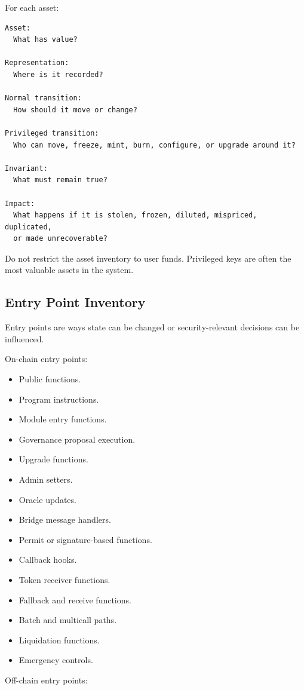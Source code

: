For each asset:

\begin{lstlisting}
Asset:
  What has value?

Representation:
  Where is it recorded?

Normal transition:
  How should it move or change?

Privileged transition:
  Who can move, freeze, mint, burn, configure, or upgrade around it?

Invariant:
  What must remain true?

Impact:
  What happens if it is stolen, frozen, diluted, mispriced, duplicated,
  or made unrecoverable?
\end{lstlisting}

Do not restrict the asset inventory to user funds. Privileged keys are
often the most valuable assets in the system.

\subsection{Entry Point Inventory}

Entry points are ways state can be changed or security-relevant
decisions can be influenced.

On-chain entry points:

\begin{itemize}
\tightlist
\item
  Public functions.
\item
  Program instructions.
\item
  Module entry functions.
\item
  Governance proposal execution.
\item
  Upgrade functions.
\item
  Admin setters.
\item
  Oracle updates.
\item
  Bridge message handlers.
\item
  Permit or signature-based functions.
\item
  Callback hooks.
\item
  Token receiver functions.
\item
  Fallback and receive functions.
\item
  Batch and multicall paths.
\item
  Liquidation functions.
\item
  Emergency controls.
\end{itemize}

Off-chain entry points:

